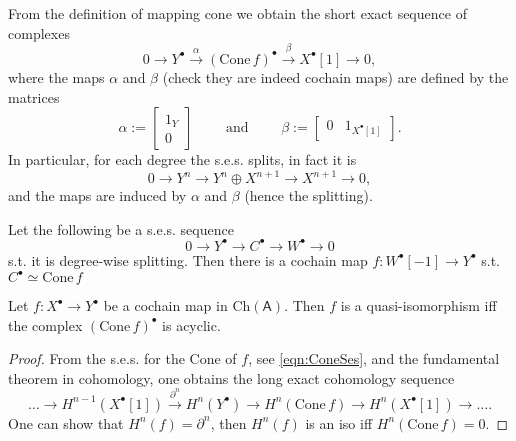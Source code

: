 \begin{rem}[]
	From the definition of mapping cone we obtain the short exact sequence of complexes
	\begin{equation}\label{eqn:ConeSes}
	0 \to Y^\bullet \xrightarrow{\alpha}
	(\mathrm{Cone}\, f)^\bullet \xrightarrow{\beta} X^\bullet[1] \to 0
	,\end{equation} 
	where the maps $\alpha$ and $\beta$ (check they are indeed cochain maps) are defined by the matrices
	\begin{equation}
	\alpha := 
	\begin{bmatrix}
		1_Y \\ 0
	\end{bmatrix} \qquad \text{ and } \qquad
	\beta := 
	\begin{bmatrix}
		0 & 1_{X^\bullet[1]}
	\end{bmatrix} 
	.\end{equation} 
	In particular, for each degree the s.e.s. splits, in fact it is
	\begin{equation}
	0 \to Y^n \to Y^n \oplus X^{n+1} \to X^{n+1} \to 0
	,\end{equation} 
	and the maps are induced by $\alpha$ and $\beta$ (hence the splitting).
\end{rem}

\begin{lem}
	Let the following be a s.e.s. sequence
	\begin{equation}
	0 \to Y^\bullet \to C^\bullet \to W^\bullet \to 0
	\end{equation} 
	s.t. it is degree-wise splitting.
	Then there is a cochain map $f: W^\bullet[-1] \to Y^\bullet$ s.t.
	$C^\bullet \simeq \mathrm{Cone}\, f$
\end{lem} 

\begin{lem}
	Let $f: X^\bullet \to Y^\bullet$ be a cochain map in $\mathrm{Ch}(\mathsf{A})$.
	Then $f$ is a quasi-isomorphism iff the complex
	$(\mathrm{Cone}\, f)^\bullet$ is acyclic.
\end{lem} 
\begin{proof}
	From the s.e.s. for the Cone of $f$, see \eqref{eqn:ConeSes}, and the 
	fundamental theorem in cohomology, one obtains the long exact cohomology sequence
	\begin{equation}
		\ldots \to H^{n-1}(X^\bullet[1]) \xrightarrow{\partial^n} H^n(Y^\bullet) \to
		H^n(\mathrm{Cone}\, f) \to H^n(X^\bullet[1]) \to \ldots
	.\end{equation} 
	One can show that $H^n(f) = \partial^n$, then
	$H^n(f)$ is an iso iff $H^n(\mathrm{Cone}\, f) = 0$.
\end{proof}

